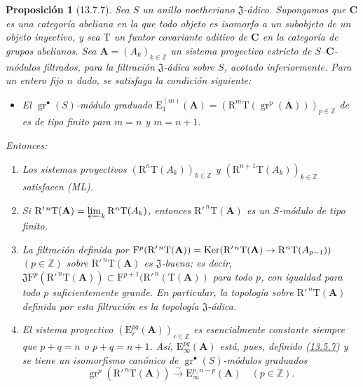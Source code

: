 \documentclass[10pt,oneside,openany]{book}
\theoremstyle{egaenv}\newtheorem*{env}{---}
\theoremstyle{egastatement}
\newtheorem*{proposition}{Proposición}
\theoremstyle{egadescription}
\newcommand{\oldpage}[2][]{\marginnote{\normalfont\scriptsize\textbf{#1}\,|\,#2}\ignorespaces}
\renewcommand{\to}{\mathchoice{\longrightarrow}{\rightarrow}{\rightarrow}{\rightarrow}}
\begin{document}
\begin{proposition}[13.7.7]
\label{0.13.7.7}
\label{0.13.7.7-fr}
Sea $S$ un anillo noetheriano $\mathfrak J$-ádico.
Supongamos que $\boldsymbol{C}$ es una categoría abeliana en la que todo objeto
es isomorfo a un subobjeto de un objeto inyectivo, y sea
$\mathrm T$ un funtor covariante aditivo de $\boldsymbol{C}$ en la
categoría de grupos abelianos.
Sea $\mathbf A=(A_k)_{k\in\mathbb Z}$ un
\oldpage[0\textsubscript{III}]{78}
sistema proyectivo estricto de $S$--$\boldsymbol{C}$-módulos filtrados, para la
filtración $\mathfrak J$-ádica sobre $S$, acotado inferiormente.
Para un entero fijo $n$ dado, se satisfaga la condición siguiente:
\begin{itemize}
\item[$(\mathrm F_n)$]
  \emph{El $\operatorname{gr}^\bullet(S)$-módulo graduado}
  $\mathrm E_1^{(m)}(\mathbf A)=
(\mathrm R^m\mathrm T(\operatorname{gr}^p(\mathbf A)))_{p\in\mathbb Z}$
  \emph{de  es de tipo finito para
  $m=n$ y $m=n+1$.}
\end{itemize}
Entonces:
\begin{enumerate}
  \item[{\rm(i)}] Los sistemas proyectivos
  $(\mathrm R^n\mathrm T(A_k))_{k\in\mathbb Z}$ y
  $(\mathrm R^{n+1}\mathrm T(A_k))_{k\in\mathbb Z}$ satisfacen {\rm(ML)}.
  \item[{\rm(ii)}] Si
  $\mathrm R'^{\,n}\mathrm T(\mathbf A)=
\varprojlim_k\mathrm R^n\mathrm T(A_k)$,
  entonces $\mathrm R'^{\,n}\mathrm T(\mathbf A)$ es un $S$-módulo de tipo finito.
\item[\rm(iii)] La filtración definida por $\mathrm F^p(\mathrm R'^{\,n}\mathrm T(\mathbf A))=
\operatorname{Ker}(\mathrm R'^{\,n}\mathrm T(\mathbf A)
\to\mathrm R^n\mathrm T(A_{p-1}))$ $(p\in\mathbb Z)$ sobre $\mathrm R'^{\,n}\mathrm T(\mathbf A)$ es $\mathfrak J$-buena; es decir,
  $\mathfrak J\mathrm F^p(\mathrm R'^{\,n}\mathrm T(\mathbf A))
\subset\mathrm F^{p+1}(\mathrm R'^{\,n}(\mathrm T(\mathbf A))$
  para todo $p$, con igualdad para todo $p$ suficientemente grande.
  En particular, la topología sobre
  $\mathrm R'^{\,n}\mathrm T(\mathbf A)$ definida por esta filtración es la
  topología $\mathfrak J$-ádica.
  \item[{\rm(iv)}] El sistema proyectivo
  $(\mathrm E_r^{pq}(\mathbf A))_{r\in\mathbb Z}$ es esencialmente constante siempre que
  $p+q=n$ o $p+q=n+1$.
  Así, $\mathrm E_\infty^{pq}(\mathbf A)$ está, pues, definido \textup{(\hyperref[0.13.5.7-fr]{13.5.7})} y se tiene un isomorfismo canónico de $\operatorname{gr}^\bullet(S)$-módulos graduados
\begin{equation}
\label{0.13.7.7.1-fr}
\tag{13.7.7.1}
\operatorname{gr}^p(\mathrm R'^{\,n}\mathrm T(\mathbf A))
\xrightarrow{\sim}\mathrm E_\infty^{p,n-p}(\mathbf A)
\quad(p\in\mathbb Z).
\end{equation}
\end{enumerate}
\end{proposition}
\end{document}

